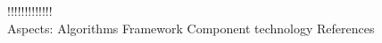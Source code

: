 \documentclass[a4paper]{article}
\begin{document}


!!!!!!!!!!!!! \\
Aspects:
    Algorithms
    Framework
    Component technology
References \cite{porter2000location}



  
  




{}
\end{document}
